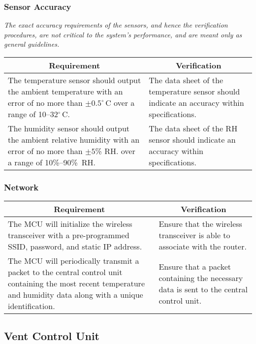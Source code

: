 \subsubsection{Sensor Accuracy}
\label{sensor_acc}
{\em The exact accuracy requirements of the sensors, and hence the verification procedures, are not critical to the system's performance, and are meant only as general guidelines. }

\noindent
\begin{tabular}{|p{\mytabwidth}|p{\mytabwidth}|}
\hline
\multicolumn{1}{|c|}{Requirement} & \multicolumn{1}{|c|}{Verification} \\
\hline\hline
The temperature sensor should output the ambient temperature with an error of no more than $\pm0.5^\circ\,$C over a range of 10--32$^\circ$\,C. &
The data sheet of the temperature sensor should indicate an accuracy within specifications. \\
\hline
The humidity sensor should output the ambient relative humidity with an error of no more than $\pm 5$\% RH. over a range of 10\%--90\%\ RH. &
The data sheet of the RH sensor should indicate an accuracy within specifications. \\
\hline
\end{tabular}

\subsubsection{Network}
\begin{tabular}{|p{\mytabwidth}|p{\mytabwidth}|}
\hline
\multicolumn{1}{|c|}{Requirement} & \multicolumn{1}{|c|}{Verification} \\
\hline\hline
The MCU will initialize the wireless transceiver with a pre-programmed SSID, password, and static IP address. &
Ensure that the wireless transceiver is able to associate with the router. \\
\hline
The MCU will periodically transmit a packet to the central control unit containing the most recent temperature and humidity data along with a unique identification. &
Ensure that a packet containing the necessary data is sent to the central control unit. \\
\hline
\end{tabular}

\subsection{Vent Control Unit}
